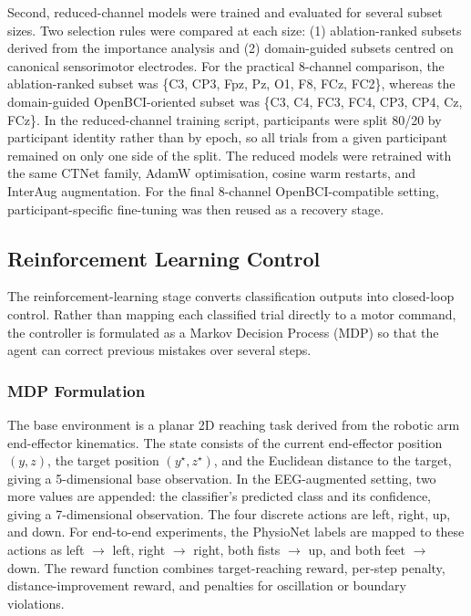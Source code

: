 \documentclass[12pt, a4paper]{article}
\begin{document}
Second, reduced-channel models were trained and evaluated for several subset sizes. Two selection rules were compared at each size: (1) ablation-ranked subsets derived from the importance analysis and (2) domain-guided subsets centred on canonical sensorimotor electrodes. For the practical 8-channel comparison, the ablation-ranked subset was \{C3, CP3, Fpz, Pz, O1, F8, FCz, FC2\}, whereas the domain-guided OpenBCI-oriented subset was \{C3, C4, FC3, FC4, CP3, CP4, Cz, FCz\}. In the reduced-channel training script, participants were split 80/20 by participant identity rather than by epoch, so all trials from a given participant remained on only one side of the split. The reduced models were retrained with the same CTNet family, AdamW optimisation, cosine warm restarts, and InterAug augmentation. For the final 8-channel OpenBCI-compatible setting, participant-specific fine-tuning was then reused as a recovery stage.

\subsection{Reinforcement Learning Control}

The reinforcement-learning stage converts classification outputs into closed-loop control. Rather than mapping each classified trial directly to a motor command, the controller is formulated as a Markov Decision Process (MDP) so that the agent can correct previous mistakes over several steps.

\subsubsection{MDP Formulation}

The base environment is a planar 2D reaching task derived from the robotic arm end-effector kinematics. The state consists of the current end-effector position $(y, z)$, the target position $(y^\star, z^\star)$, and the Euclidean distance to the target, giving a 5-dimensional base observation. In the EEG-augmented setting, two more values are appended: the classifier's predicted class and its confidence, giving a 7-dimensional observation. The four discrete actions are left, right, up, and down. For end-to-end experiments, the PhysioNet labels are mapped to these actions as left $\rightarrow$ left, right $\rightarrow$ right, both fists $\rightarrow$ up, and both feet $\rightarrow$ down. The reward function combines target-reaching reward, per-step penalty, distance-improvement reward, and penalties for oscillation or boundary violations.
\end{document}
